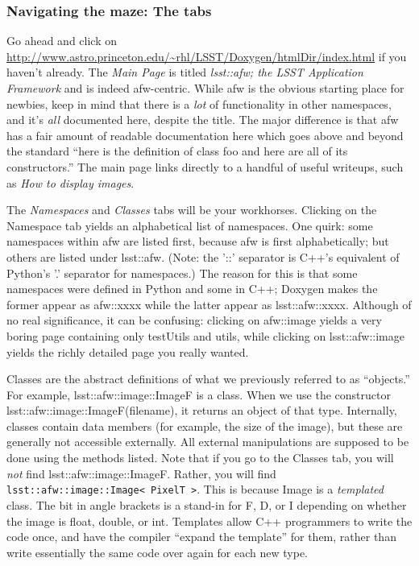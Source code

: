 \subsubsection{Navigating the maze:  The tabs}

Go ahead and click on
\url{http://www.astro.princeton.edu/~rhl/LSST/Doxygen/htmlDir/index.html}
if you haven't already.  The {\it Main Page} is titled {\it lsst::afw; the
LSST Application Framework} and is indeed afw-centric.  While afw is
the obvious starting place for newbies, keep in mind that there is a
{\it lot} of functionality in other namespaces, and it's {\it all}
documented here, despite the title.  The major difference is that afw
has a fair amount of readable documentation here which goes above and
beyond the standard ``here is the definition of class foo and here are
all of its constructors.''  The main page links directly to a handful
of useful writeups, such as {\it How to display images}.

The {\it Namespaces} and {\it Classes} tabs will be your workhorses.
Clicking on the Namespace tab yields an alphabetical list of
namespaces.  One quirk: some namespaces within afw are listed first,
because afw is first alphabetically; but others are listed under
lsst::afw. (Note: the '::' separator is C++'s equivalent of Python's
'.' separator for namespaces.)  The reason for this is that some
namespaces were defined in Python and some in C++; Doxygen makes the
former appear as afw::xxxx while the latter appear as lsst::afw::xxxx.
Although of no real significance, it can be confusing: clicking on
afw::image yields a very boring page containing only testUtils and
utils, while clicking on lsst::afw::image yields the richly detailed
page you really wanted.  

Classes are the abstract definitions of what we previously referred to
as ``objects.'' For example, lsst::afw::image::ImageF is a class.
When we use the constructor lsst::afw::image::ImageF(filename), it
returns an object of that type.  Internally, classes contain data
members (for example, the size of the image), but these are generally
not accessible externally.  All external manipulations are supposed to
be done using the methods listed.  Note that if you go to the Classes
tab, you will {\it not} find lsst::afw::image::ImageF. Rather, you
will find \texttt{lsst::afw::image::Image< PixelT >}.  This is
because Image is a {\it templated} class.  The bit in angle brackets
is a stand-in for F, D, or I depending on whether the image is float,
double, or int.  Templates allow C++ programmers to write the code
once, and have the compiler ``expand the template'' for them, rather
than write essentially the same code over again for each new type.

